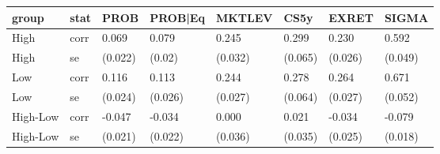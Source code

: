 
\begin{tabular}{l|l|l|l|l|l|l|l}
\hline
group & stat & PROB & PROB|Eq & MKTLEV & CS5y & EXRET & SIGMA\\
\hline
High & corr & 0.069 & 0.079 & 0.245 & 0.299 & 0.230 & 0.592\\
High & se & (0.022) & (0.02) & (0.032) & (0.065) & (0.026) & (0.049)\\
Low & corr & 0.116 & 0.113 & 0.244 & 0.278 & 0.264 & 0.671\\
Low & se & (0.024) & (0.026) & (0.027) & (0.064) & (0.027) & (0.052)\\
High-Low & corr & -0.047 & -0.034 & 0.000 & 0.021 & -0.034 & -0.079\\
High-Low & se & (0.021) & (0.022) & (0.036) & (0.035) & (0.025) & (0.018)\\
\hline
\end{tabular}

